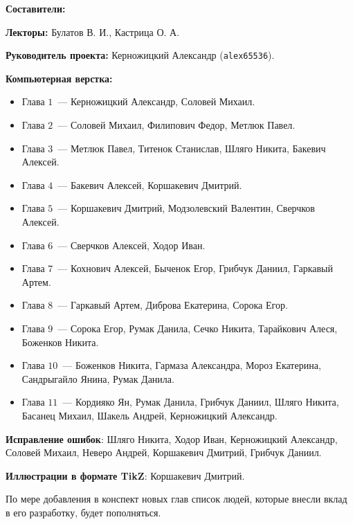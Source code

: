 \documentclass[../main.tex]{subfiles}
\begin{document}
{\Huge \bf Составители:}

\vspace{2em}

{
    \textbf{Лекторы:} Булатов В. И., Кастрица О. А.
    
    \smallskip
    
    \textbf{Руководитель проекта:} Керножицкий Александр 
    (\texttt{alex65536}).
    
    \smallskip
    
    \textbf{Компьютерная верстка:}
    \begin{itemize}
     \item Глава $1$~--- Керножицкий Александр, Соловей Михаил.
     \item Глава $2$~--- Соловей Михаил, Филипович Федор, Метлюк 
     Павел.
     \item Глава $3$~--- Метлюк Павел, Титенок Станислав, Шляго 
     Никита, Бакевич Алексей.
     \item Глава $4$~--- Бакевич Алексей, Коршакевич Дмитрий.
     \item Глава $5$~--- Коршакевич Дмитрий, Модзолевский 
     Валентин, Сверчков Алексей.
     \item Глава $6$~--- Сверчков Алексей, Ходор Иван.
     \item Глава $7$~--- Кохнович Алексей, Быченок Егор, Грибчук Даниил,
     Гаркавый Артем.
     \item Глава $8$~--- Гаркавый Артем, Диброва Екатерина, Сорока Егор.
     \item Глава $9$~--- Сорока Егор, Румак Данила, Сечко Никита, Тарайкович 
     Алеся, Боженков Никита.
     \item Глава $10$~--- Боженков Никита, Гармаза Александра, Мороз
     Екатерина, Сандрыгайло Янина, Румак Данила.
     \item Глава $11$~--- Кордияко Ян, Румак Данила, Грибчук Даниил, Шляго
     Никита, Басанец Михаил, Шакель Андрей, Керножицкий Александр.
    \end{itemize}
    
    \textbf{Исправление ошибок}: Шляго Никита, Ходор Иван,
    Керножицкий Александр, Соловей Михаил, Неверо Андрей, Коршакевич Дмитрий,
    Грибчук Даниил.
    
    \smallskip
    
    \textbf{Иллюстрации в формате TikZ}: Коршакевич Дмитрий.
    
    \smallskip
    
    По мере добавления в конспект новых глав список людей, которые 
    внесли вклад в его разработку, будет пополняться.
    
}
\end{document}
